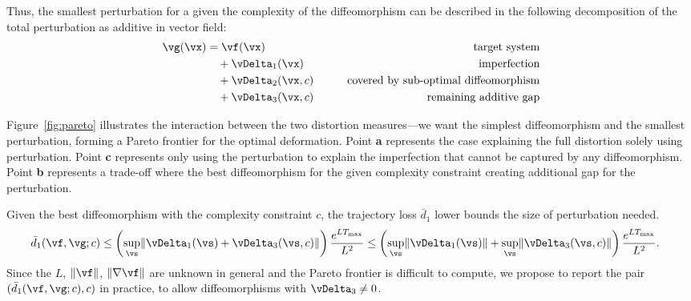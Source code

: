 \documentclass{article}
\theoremstyle{definition} \newtheorem{definition}{Definition}  \newtheorem{example}{Example}
\theoremstyle{remark} \newtheorem{remark}{Remark}
\newcounter{ct}
\DeclarePairedDelimiter{\norm}{\lVert}{\rVert}
\begin{document}
Thus, the smallest perturbation for a given the complexity of the diffeomorphism can be described in the following decomposition of the total perturbation as additive in vector field:
\begin{align}\label{eq:decomp:triple}
    \vg(\vx) &= 
	\vf(\vx)
	&\qquad\text{target system}
	\\
	&\quad+\vDelta_1(\vx)
	&\qquad\text{imperfection}
	\\
	&\quad+\vDelta_2(\vx, c)
	&\qquad\text{covered by sub-optimal diffeomorphism}
	\\
	&\quad+\vDelta_3(\vx, c)
	&\qquad\text{remaining additive gap}
\end{align}

Figure~\ref{fig:pareto} illustrates the interaction between the two distortion measures---we want the simplest diffeomorphism and the smallest perturbation, forming a Pareto frontier for the optimal deformation.
Point \textbf{a} represents the case explaining the full distortion solely using perturbation.
Point \textbf{c} represents only using the perturbation to explain the imperfection that cannot be captured by any diffeomorphism.
Point \textbf{b} represents a trade-off where the best diffeomorphism for the given complexity constraint creating additional gap for the perturbation.

Given the best diffeomorphism with the complexity constraint $c$, the trajectory loss $\bar{d}_1$ lower bounds the size of perturbation needed.
\begin{align}
    \bar{d}_1(\vf, \vg; c)
	&\leq
	    \left(\sup_\vs \norm{\vDelta_1(\vs) + \vDelta_3(\vs, c)}\right)
	    \frac{e^{LT_{\text{max}}}}{L^2}
	\leq
	    \left(\sup_\vs\norm{\vDelta_1(\vs)} + \sup_\vs\norm{\vDelta_3(\vs, c)}\right)
	    \frac{e^{LT_{\text{max}}}}{L^2}.
\end{align}
Since the $L$, $\norm{\vf}$, $\norm{\nabla\vf}$ are unknown in general and the Pareto frontier is difficult to compute, we propose to report the pair $(\bar{d}_1(\vf, \vg; c), c)$ in practice, to allow diffeomorphisms with $\vDelta_3 \neq 0$.
\end{document}
